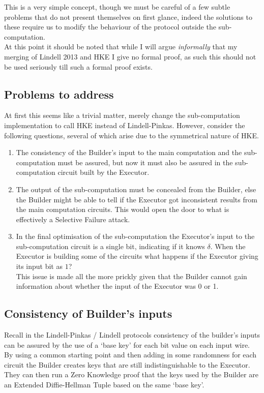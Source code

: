 \documentclass[ %
                    author={Nicholas Tutte},
                supervisor={Prof. Nigel Smart},
                    degree={MEng},
                     title={Secure Two Party Computation},
                  subtitle={A practical comparison of recent protocols},
                      type={Research - GG1K},
                      year={2015} ]{dissertation}
\begin{document}
			This is a very simple concept, though we must be careful of a few subtle problems that do not present themselves on first glance, indeed the solutions to these require us to modify the behaviour of the protocol outside the sub-computation.\\

			At this point it should be noted that while I will argue \emph{informally} that my merging of Lindell 2013 and HKE I give no formal proof, as such this should not be used seriously till such a formal proof exists.

			\subsection{Problems to address}
				At first this seems like a trivial matter, merely change the sub-computation implementation to call HKE instead of Lindell-Pinkas. However, consider the following questions, several of which arise due to the symmetrical nature of HKE.

				\begin{enumerate}
					\item The consistency of the Builder's input to the main computation and the sub-computation must be assured, but now it must also be assured in the sub-computation circuit built by the Executor.
					
					\item The output of the sub-computation must be concealed from the Builder, else the Builder might be able to tell if the Executor got inconsistent results from the main computation circuits. This would open the door to what is effectively a Selective Failure attack.

					\item In the final optimisation of the sub-computation the Executor's input to the sub-computation circuit is a single bit, indicating if it knows $\delta$. When the Executor is building some of the circuits what happens if the Executor giving its input bit as $1$?\\

					This issue is made all the more prickly given that the Builder cannot gain information about whether the input of the Executor was 0 or 1.
				\end{enumerate}


			\subsection{Consistency of Builder's inputs}
				Recall in the Lindell-Pinkas / Lindell protocols consistency of the builder's inputs can be assured by the use of a `base key' for each bit value on each input wire. By using a common starting point and then adding in some randomness for each circuit the Builder creates keys that are still indistinguishable to the Executor. They can then run a Zero Knowledge proof that the keys used by the Builder are an Extended Diffie-Hellman Tuple based on the same `base key'.\\
\end{document}
